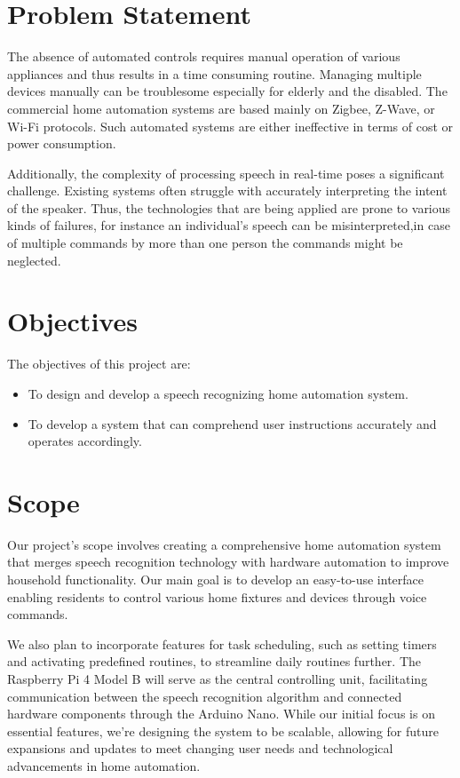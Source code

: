     \section{Problem Statement}
    The absence of automated controls requires manual operation of various appliances and thus results in a time consuming routine. Managing multiple devices  manually  can be troublesome especially for elderly and the disabled. The commercial home automation systems are based mainly on Zigbee, Z-Wave, or Wi-Fi protocols. Such automated systems are either ineffective in terms of cost or power consumption. 

    Additionally, the complexity of processing speech in real-time poses a significant challenge. Existing systems often struggle with accurately interpreting the intent of the speaker. Thus, the technologies that are being applied are prone to various kinds of failures, for instance an individual’s speech can be misinterpreted,in case of multiple commands by more than one person the commands might be neglected. 

    
    \section{Objectives}
    The objectives of this project are:
        \begin{itemize}
        \setlength\itemsep{1.5pt}
        \item To design and develop a speech recognizing home automation system.
 
        \item To develop a system that can comprehend user instructions accurately and operates accordingly.

        \end{itemize}


    \section{Scope}
    Our project's scope involves creating a comprehensive home automation system that merges speech recognition technology with hardware automation to improve household functionality. Our main goal is to develop an easy-to-use interface enabling residents to control various home fixtures and devices through voice commands. 

    We also plan to incorporate features for task scheduling, such as setting timers and activating predefined routines, to streamline daily routines further. The Raspberry Pi 4 Model B will serve as the central controlling unit, facilitating communication between the speech recognition algorithm and connected hardware components through the Arduino Nano. While our initial focus is on essential features, we're designing the system to be scalable, allowing for future expansions and updates to meet changing user needs and technological advancements in home automation.
         